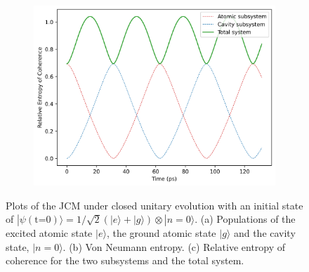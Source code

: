 \documentclass[11pt]{article}
\begin{document}
\begin{figure}[h]
    \begin{subfigure}{0.45\textwidth}
        \centering
        \includegraphics[width=\linewidth]{Research Project/Code/results/JCM/CQS_coh_eg.png}
        \caption{}
        \label{fig:jcm_cqs_coh_eg}
    \end{subfigure}
    \hfill

    \caption{Plots of the JCM under closed unitary evolution with an initial state of $|\psi (\text{t=0})\rangle = 1/\sqrt{2}(|e\rangle + |g\rangle)\otimes|n=0\rangle$. (a) Populations of the excited atomic state $|e\rangle$, the ground atomic state $|g\rangle$ and the cavity state, $|n=0\rangle$. (b) Von Neumann entropy. (c) Relative entropy of coherence for the two subsystems and the total system.}
    \label{fig:JCM_cqs_e0g0}
\end{figure}
\end{document}
